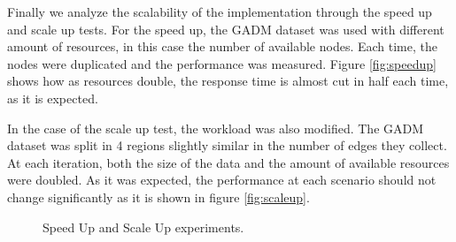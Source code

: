 Finally we analyze the scalability of the implementation through the speed up and scale up tests.  For the speed up, the GADM dataset was used with different amount of resources, in this case the number of available nodes.  Each time, the nodes were duplicated and the performance was measured.  Figure \ref{fig:speedup} shows  how as resources double, the response time is almost cut in half each time, as it is expected.  

In the case of the scale up test, the workload was also modified.  The GADM dataset was split in 4 regions slightly similar in the number of edges they collect.  At each iteration, both the size of the data and the amount of available resources were doubled. As it was expected, the performance at each scenario should not change significantly as it is shown in figure \ref{fig:scaleup}.

\begin{figure}[!ht]
    \centering
    \hfill
    \caption{Speed Up and Scale Up experiments.} \label{fig:speed_scale} 
\end{figure}
